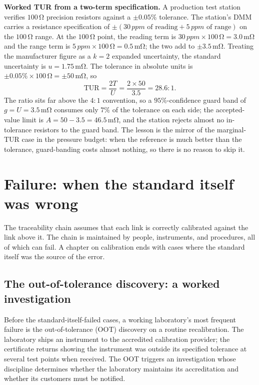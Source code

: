 \textbf{Worked TUR from a two-term specification.} A production test
station verifies $100\,\si{\ohm}$ precision resistors against a
$\pm 0.05\%$ tolerance. The station's DMM carries a resistance
specification of $\pm (30\,\si{ppm}\text{ of reading} + 5\,\si{ppm}
\text{ of range})$ on the $100\,\si{\ohm}$ range. At the
$100\,\si{\ohm}$ point, the reading term is $30\,\si{ppm} \times
100\,\si{\ohm} = 3.0\,\si{\milli\ohm}$ and the range term is
$5\,\si{ppm} \times 100\,\si{\ohm} = 0.5\,\si{\milli\ohm}$; the
two add to $\pm 3.5\,\si{\milli\ohm}$. Treating the manufacturer
figure as a $k = 2$ expanded uncertainty, the standard uncertainty
is $u = 1.75\,\si{\milli\ohm}$. The tolerance in absolute units is
$\pm 0.05\% \times 100\,\si{\ohm} = \pm 50\,\si{\milli\ohm}$, so
\[
\mathrm{TUR} = \frac{2 T}{U} = \frac{2 \times 50}{3.5}
= 28.6{:}1.
\]
The ratio sits far above the $4{:}1$ convention, so a
$95\%$-confidence guard band of $g = U = 3.5\,\si{\milli\ohm}$
consumes only $7\%$ of the tolerance on each side; the accepted-value
limit is $A = 50 - 3.5 = 46.5\,\si{\milli\ohm}$, and the station
rejects almost no in-tolerance resistors to the guard band. The
lesson is the mirror of the marginal-TUR case in the pressure budget:
when the reference is much better than the tolerance, guard-banding
costs almost nothing, so there is no reason to skip it.

\section{Failure: when the standard itself was wrong}

The traceability chain assumes that each link is correctly
calibrated against the link above it. The chain is maintained by
people, instruments, and procedures, all of which can fail. A
chapter on calibration ends with cases where the standard itself
was the source of the error.

\subsection{The out-of-tolerance discovery: a worked investigation}

Before the standard-itself-failed cases, a working laboratory's
most frequent failure is the out-of-tolerance (OOT) discovery on
a routine recalibration. The laboratory ships an instrument to
the accredited calibration provider; the certificate returns
showing the instrument was outside its specified tolerance at
several test points when received. The OOT triggers an
investigation whose discipline determines whether the laboratory
maintains its accreditation and whether its customers must be
notified.

